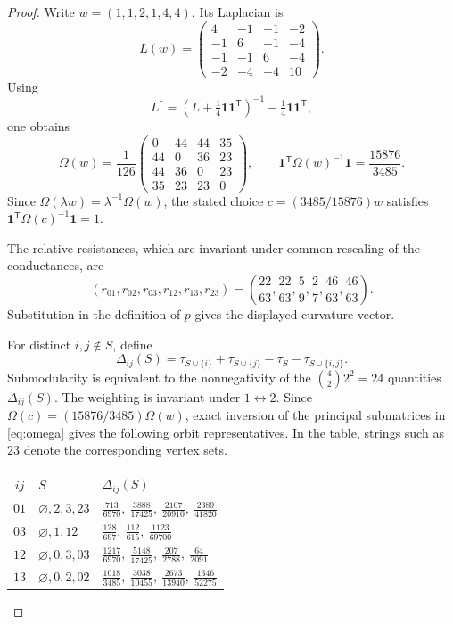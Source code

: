 \documentclass[11pt]{amsart}
\theoremstyle{remark}
\newcommand{\one}{\mathbf{1}}
\begin{document}
\begin{proof}
Write $w=(1,1,2,1,4,4)$. Its Laplacian is
\[
 L(w)=
 \begin{pmatrix}
 4&-1&-1&-2\\
 -1&6&-1&-4\\
 -1&-1&6&-4\\
 -2&-4&-4&10
 \end{pmatrix}.
\]
Using
\[
 L^\dagger=
 \left(L+\tfrac14\one\one^{\mathsf T}\right)^{-1}
 -\tfrac14\one\one^{\mathsf T},
\]
one obtains
\begin{equation}\label{eq:omega}
 \Omega(w)=\frac1{126}
 \begin{pmatrix}
 0&44&44&35\\
 44&0&36&23\\
 44&36&0&23\\
 35&23&23&0
 \end{pmatrix},
 \qquad
 \one^{\mathsf T}\Omega(w)^{-1}\one=\frac{15876}{3485}.
\end{equation}
Since $\Omega(\lambda w)=\lambda^{-1}\Omega(w)$, the stated choice
$c=(3485/15876)w$ satisfies
$\one^{\mathsf T}\Omega(c)^{-1}\one=1$.

The relative resistances, which are invariant under common rescaling of the
conductances, are
\[
 (r_{01},r_{02},r_{03},r_{12},r_{13},r_{23})
 =
 \left(
 \frac{22}{63},
 \frac{22}{63},
 \frac59,
 \frac27,
 \frac{46}{63},
 \frac{46}{63}
 \right).
\]
Substitution in the definition of $p$ gives the displayed curvature vector.

For distinct $i,j\notin S$, define
\[
 \Delta_{ij}(S)=
 \tau_{S\cup\{i\}}+\tau_{S\cup\{j\}}
 -\tau_S-\tau_{S\cup\{i,j\}}.
\]
Submodularity is equivalent to the nonnegativity of the
$\binom42 2^2=24$ quantities $\Delta_{ij}(S)$. The weighting is invariant
under $1\leftrightarrow2$. Since
$\Omega(c)=(15876/3485)\Omega(w)$, exact inversion of the principal
submatrices in \eqref{eq:omega} gives the following orbit representatives.
In the table, strings such as $23$ denote the corresponding vertex sets.

\begin{center}
\renewcommand{\arraystretch}{1.18}
\begin{tabular}{@{}c@{\qquad}l@{\qquad}l@{}}
\toprule
$ij$ & $S$ & $\Delta_{ij}(S)$ \\
\midrule
$01$ & $\varnothing,2,3,23$
& $\tfrac{713}{6970},\ \tfrac{3888}{17425},\
   \tfrac{2107}{20910},\ \tfrac{2389}{41820}$ \\
$03$ & $\varnothing,1,12$
& $\tfrac{128}{697},\ \tfrac{112}{615},\
   \tfrac{1123}{69700}$ \\
$12$ & $\varnothing,0,3,03$
& $\tfrac{1217}{6970},\ \tfrac{5148}{17425},\
   \tfrac{207}{2788},\ \tfrac{64}{2091}$ \\
$13$ & $\varnothing,0,2,02$
& $\tfrac{1018}{3485},\ \tfrac{3038}{10455},\
   \tfrac{2673}{13940},\ \tfrac{1346}{52275}$ \\
\bottomrule
\end{tabular}
\end{center}


\end{proof}
\end{document}
